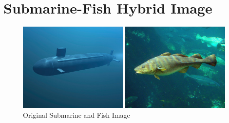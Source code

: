 \documentclass[12pt]{report}
\begin{document}
\section{Submarine-Fish Hybrid Image}
\vspace{1.25em}
\begin{figure}[H]
    \centering
    \begin{minipage}{0.45\textwidth}
            \centering
            \includegraphics[height=12em]{./images/submarine.jpg}
        \end{minipage}
        \begin{minipage}{0.45\textwidth}
            \centering
            \includegraphics[height=12em]{./images/fish.jpg}
        \end{minipage}
        \caption{Original Submarine and Fish Image}
        \label{submarine_fish}
\end{figure}
\end{document}
